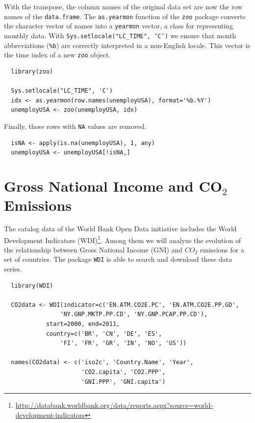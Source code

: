 \documentclass[smallroyalvopaper]{memoir}
\begin{document}
With the transpose, the column names of the original data set are
now the row names of the \texttt{data.frame}. The \texttt{as.yearmon} function
of the \texttt{zoo} package converts the character vector of names into a
\texttt{yearmon} vector, a class for representing monthly data. With
\texttt{Sys.setlocale("LC\_TIME", 'C')} we ensure that month abbreviations
(\texttt{\%b}) are correctly interpreted in a non-English locale. This
vector is the time index of a new \texttt{zoo} object. 


\lstset{language=r,label= ,caption= ,captionpos=b,numbers=none}
\begin{lstlisting}
  library(zoo)
  
  Sys.setlocale("LC_TIME", 'C')
  idx <- as.yearmon(row.names(unemployUSA), format='%b.%Y')
  unemployUSA <- zoo(unemployUSA, idx)
\end{lstlisting}

Finally, those rows with \texttt{NA} values are removed.
\lstset{language=r,label= ,caption= ,captionpos=b,numbers=none}
\begin{lstlisting}
  isNA <- apply(is.na(unemployUSA), 1, any)
  unemployUSA <- unemployUSA[!isNA,]
\end{lstlisting}

\section{Gross National Income and CO\(_{\text{2}}\) Emissions}
\label{sec:org0e2c416}
The catalog data of the World Bank Open Data initiative includes the
World Development Indicators (WDI)\footnote{\url{http://databank.worldbank.org/data/reports.aspx?source=world-development-indicators}}. Among them we will analyze
the evolution of the relationship between Gross National Income (GNI)
and \(CO_2\) emissions for a set of countries. The package \texttt{WDI} is able
to search and download these data series.


\lstset{language=r,label= ,caption= ,captionpos=b,numbers=none}
\begin{lstlisting}
  library(WDI)
    
  CO2data <- WDI(indicator=c('EN.ATM.CO2E.PC', 'EN.ATM.CO2E.PP.GD',
                'NY.GNP.MKTP.PP.CD', 'NY.GNP.PCAP.PP.CD'),
            start=2000, end=2011,
            country=c('BR', 'CN', 'DE', 'ES',
                'FI', 'FR', 'GR', 'IN', 'NO', 'US'))

  names(CO2data) <- c('iso2c', 'Country.Name', 'Year',
                      'CO2.capita', 'CO2.PPP',
                      'GNI.PPP', 'GNI.capita')
\end{lstlisting}
\end{document}

